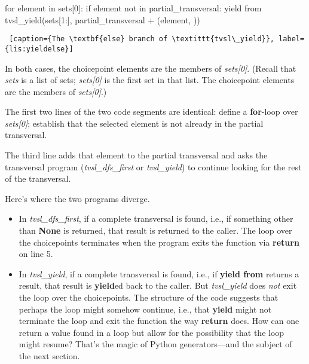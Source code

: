 \begin{minipage}{\linewidth} \largev   \hrulefill
\begin{python}[numbers=left]
    for element in sets[0]:
      if element not in partial_transversal:
        yield from tvsl_yield(sets[1:], partial_transversal + (element, ))
\end{python}
\begin{lstlisting} [caption={The \textbf{else} branch of \textittt{tvsl\_yield}}, label={lis:yieldelse}]
\end{lstlisting}
\end{minipage}

In both cases, the choicepoint elements are the members of \textit{sets[0]}. (Recall that \textit{sets} is a list of sets; \textit{sets[0]} is the first set in that list. The choicepoint elements are the members of \textit{sets[0]}.) 

The first two lines of the two code segments are identical: define a \textbf{for}-loop over \textit{sets[0]}; establish that the selected element is not already in the partial transversal.

The third line adds that element to the partial transversal and asks the transversal program (\textit{tvsl\_dfs\_first} or \textit{tvsl\_yield}) to continue looking for the rest of the transversal. 

Here's where the two programs diverge.
\begin{itemize}
    \item In \textit{tvsl\_dfs\_first}, if a complete transversal is found, i.e., if something other than \textbf{None} is returned, that result is returned to the caller. The loop over the choicepoints terminates when the program exits the function via \textbf{return} on line 5.
    
    \item In \textit{tvsl\_yield}, if a complete transversal is found, i.e., if \textbf{yield from} returns a result, that result is \textbf{yield}ed back to the caller. But \textit{tvsl\_yield} does \textit{not} exit the loop over the choicepoints. The structure of the code suggests that perhaps the loop might somehow continue, i.e., that \textbf{yield} might not terminate the loop and exit the function the way \textbf{return} does. How can one return a value found in a loop but allow for the possibility that the loop might resume? That's the magic of Python generators---and the subject of the next section. 
\end{itemize}

